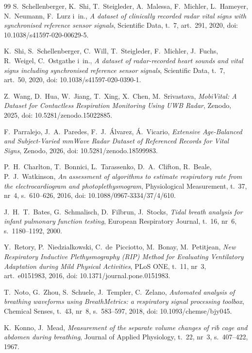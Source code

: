 \documentclass[12pt,a4paper,oneside]{report}
\begin{document}
\begin{thebibliography}{99}
S.~Schellenberger, K.~Shi, T.~Steigleder, A.~Malessa, F.~Michler,
L.~Hameyer, N.~Neumann, F.~Lurz i~in., \emph{A dataset of clinically
recorded radar vital signs with synchronised reference sensor signals},
Scientific Data, t.~7, art.~291, 2020, doi: 10.1038/s41597-020-00629-5.

K.~Shi, S.~Schellenberger, C.~Will, T.~Steigleder, F.~Michler, J.~Fuchs,
R.~Weigel, C.~Ostgathe i~in., \emph{A dataset of radar-recorded heart
sounds and vital signs including synchronised reference sensor signals},
Scientific Data, t.~7, art.~50, 2020, doi: 10.1038/s41597-020-0390-1.

Z.~Wang, D.~Hua, W.~Jiang, T.~Xing, X.~Chen, M.~Srivastava,
\emph{MobiVital: A Dataset for Contactless Respiration Monitoring Using UWB
Radar}, Zenodo, 2025, doi: 10.5281/zenodo.15022885.

F.~Parralejo, J.~A.~Paredes, F.~J.~Álvarez, Á.~Vicario, \emph{Extensive
Age-Balanced and Subject-Varied mmWave Radar Dataset of Referenced Records
for Vital Signs}, Zenodo, 2026, doi: 10.5281/zenodo.18599983.

P.~H.~Charlton, T.~Bonnici, L.~Tarassenko, D.~A.~Clifton, R.~Beale,
P.~J.~Watkinson, \emph{An assessment of algorithms to estimate respiratory
rate from the electrocardiogram and photoplethysmogram}, Physiological
Measurement, t.~37, nr~4, s.~610--626, 2016,
doi: 10.1088/0967-3334/37/4/610.

J.~H.~T.~Bates, G.~Schmalisch, D.~Filbrun, J.~Stocks,
\emph{Tidal breath analysis for infant pulmonary function testing}, European
Respiratory Journal, t.~16, nr~6, s.~1180--1192, 2000.

Y.~Retory, P.~Niedzialkowski, C.~de~Picciotto, M.~Bonay, M.~Petitjean,
\emph{New Respiratory Inductive Plethysmography (RIP) Method for Evaluating
Ventilatory Adaptation during Mild Physical Activities}, PLoS ONE, t.~11,
nr~3, art.~e0151983, 2016, doi: 10.1371/journal.pone.0151983.

T.~Noto, G.~Zhou, S.~Schuele, J.~Templer, C.~Zelano, \emph{Automated analysis
of breathing waveforms using BreathMetrics: a respiratory signal processing
toolbox}, Chemical Senses, t.~43, nr~8, s.~583--597, 2018,
doi: 10.1093/chemse/bjy045.

K.~Konno, J.~Mead, \emph{Measurement of the separate volume changes of rib
cage and abdomen during breathing}, Journal of Applied Physiology, t.~22,
nr~3, s.~407--422, 1967.

\end{thebibliography}
\end{document}
